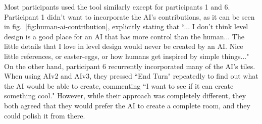 Most participants used the tool similarly except for participants 1 and 6. Participant 1 didn't want to incorporate the AI's contributions, as it can be seen in fig.~\ref{fig:human-ai-contribution}, explicitly stating that ``... I don't think level design is a good place for an AI that has more control than the human... The little details that I love in level design would never be created by an AI. Nice little references, or easter-eggs, or how humans get inspired by simple things..." On the other hand, participant 6 recurrently incorporated many of the AI's tiles. When using AIv2 and AIv3, they pressed ``End Turn" repeatedly to find out what the AI would be able to create, commenting ``I want to see if it can create something cool." However, while their approach was completely different, they both agreed that they would prefer the AI to create a complete room, and they could polish it from there.






